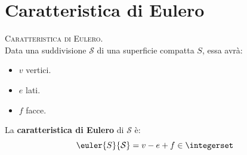 \section{Caratteristica di Eulero}
\begin{define}\textsc{Caratteristica di Eulero.}\\
	Data una suddivisione $\mathcal{S}$ di una superficie compatta $S$, essa avrà:
	\begin{itemize}
		\item $v$ vertici.
		\item $e$ lati.
		\item $f$ facce.
	\end{itemize}
La \textbf{caratteristica di Eulero} di $\mathcal{S}$ è:
\begin{equation}
	\euler{S}{\mathcal{S}}=v-e+f\in\integerset
\end{equation}
\vspace{-6mm}
\end{define}

